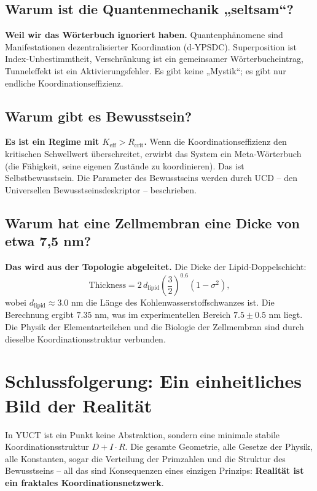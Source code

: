 \documentclass[12pt,a4paper]{article}
\newcommand{\Keff}{K_{\mathrm{eff}}}
\newcommand{\Rcrit}{R_{\mathrm{crit}}}
\begin{document}
	\subsection{Warum ist die Quantenmechanik „seltsam“?}
	
	\textbf{Weil wir das Wörterbuch ignoriert haben.} Quantenphänomene sind Manifestationen dezentralisierter Koordination (d‑YPSDC). Superposition ist Index‑Unbestimmtheit, Verschränkung ist ein gemeinsamer Wörterbucheintrag, Tunneleffekt ist ein Aktivierungsfehler. Es gibt keine „Mystik“; es gibt nur endliche Koordinationseffizienz.
	
	\subsection{Warum gibt es Bewusstsein?}
	
	\textbf{Es ist ein Regime mit \(\Keff > \Rcrit\).} Wenn die Koordinationseffizienz den kritischen Schwellwert überschreitet, erwirbt das System ein Meta‑Wörterbuch (die Fähigkeit, seine eigenen Zustände zu koordinieren). Das ist Selbstbewusstsein. Die Parameter des Bewusstseins werden durch UCD – den Universellen Bewusstseinsdeskriptor – beschrieben.
	
	\subsection{Warum hat eine Zellmembran eine Dicke von etwa 7,5 nm?}
	
	\textbf{Das wird aus der Topologie abgeleitet.} Die Dicke der Lipid‑Doppelschicht:
	\[
	\text{Thickness} = 2 \, d_{\mathrm{lipid}} \left(\frac{3}{2}\right)^{0.6} (1 - \sigma^2),
	\]
	wobei \(d_{\mathrm{lipid}} \approx 3.0\) nm die Länge des Kohlenwasserstoffschwanzes ist. Die Berechnung ergibt \(7.35\) nm, was im experimentellen Bereich \(7.5 \pm 0.5\) nm liegt. Die Physik der Elementarteilchen und die Biologie der Zellmembran sind durch dieselbe Koordinationsstruktur verbunden.
	
	\section{Schlussfolgerung: Ein einheitliches Bild der Realität}
	
	In YUCT ist ein Punkt keine Abstraktion, sondern eine minimale stabile Koordinationsstruktur \(D+I\cdot R\). Die gesamte Geometrie, alle Gesetze der Physik, alle Konstanten, sogar die Verteilung der Primzahlen und die Struktur des Bewusstseins – all das sind Konsequenzen eines einzigen Prinzips: \textbf{Realität ist ein fraktales Koordinationsnetzwerk}.
	
\end{document}
